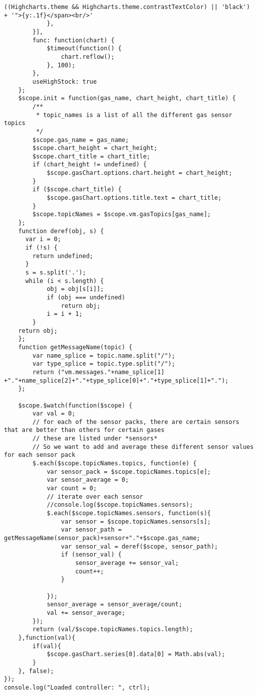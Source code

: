 \begin{lstlisting}[breaklines=true,basicstyle=\tiny]
                    ((Highcharts.theme && Highcharts.theme.contrastTextColor) || 'black') + '">{y:.1f}</span><br/>'
            },
        }],
        func: function(chart) {
            $timeout(function() {
                chart.reflow();
            }, 100);
        },    
        useHighStock: true
    };
    $scope.init = function(gas_name, chart_height, chart_title) {
        /**
         * topic_names is a list of all the different gas sensor topics
         */
        $scope.gas_name = gas_name;
        $scope.chart_height = chart_height;
        $scope.chart_title = chart_title;
        if (chart_height != undefined) {
            $scope.gasChart.options.chart.height = chart_height;
        }
        if ($scope.chart_title) {
            $scope.gasChart.options.title.text = chart_title;
        }
        $scope.topicNames = $scope.vm.gasTopics[gas_name];
    };
    function deref(obj, s) {
      var i = 0;
      if (!s) {
        return undefined;
      }
      s = s.split('.');
      while (i < s.length) {
            obj = obj[s[i]];
            if (obj === undefined)
                return obj;
            i = i + 1;
        }
    return obj;
    };
    function getMessageName(topic) {
        var name_splice = topic.name.split("/");
        var type_splice = topic.type.split("/");
        return ("vm.messages."+name_splice[1] +"."+name_splice[2]+"."+type_splice[0]+"."+type_splice[1]+".");
    };

    $scope.$watch(function($scope) {
        var val = 0;
        // for each of the sensor packs, there are certain sensors that are better than others for certain gases
        // these are listed under *sensors*
        // So we want to add and average these different sensor values for each sensor pack
        $.each($scope.topicNames.topics, function(e) {
            var sensor_pack = $scope.topicNames.topics[e];
            var sensor_average = 0;
            var count = 0;
            // iterate over each sensor
            //console.log($scope.topicNames.sensors);
            $.each($scope.topicNames.sensors, function(s){
                var sensor = $scope.topicNames.sensors[s];
                var sensor_path = getMessageName(sensor_pack)+sensor+"."+$scope.gas_name;
                var sensor_val = deref($scope, sensor_path);
                if (sensor_val) {
                    sensor_average += sensor_val;
                    count++;
                }

            });
            sensor_average = sensor_average/count;
            val += sensor_average;
        });
        return (val/$scope.topicNames.topics.length);
    },function(val){
        if(val){
            $scope.gasChart.series[0].data[0] = Math.abs(val);
        }
    }, false);
});
console.log("Loaded controller: ", ctrl);
\end{lstlisting}


